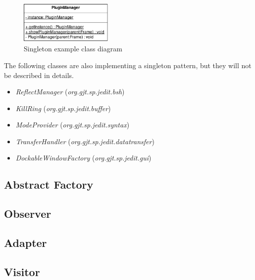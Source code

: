 \begin{figure}[h!]
    \includegraphics[width=0.4\textwidth]{images/singleton.png}
    \centering
    \caption{Singleton example class diagram}
\end{figure}

The following classes are also implementing a singleton pattern, but they will
not be described in details.

\begin{itemize}
    \item \emph{ReflectManager} (\emph{org.gjt.sp.jedit.bsh})
    \item \emph{KillRing} (\emph{org.gjt.sp.jedit.buffer})
    \item \emph{ModeProvider} (\emph{org.gjt.sp.jedit.syntax})
    \item \emph{TransferHandler} (\emph{org.gjt.sp.jedit.datatransfer})
    \item \emph{DockableWindowFactory} (\emph{org.gjt.sp.jedit.gui})
\end{itemize}

\subsection{Abstract Factory}

\subsection{Observer}

\subsection{Adapter}

\subsection{Visitor}

\newpage
